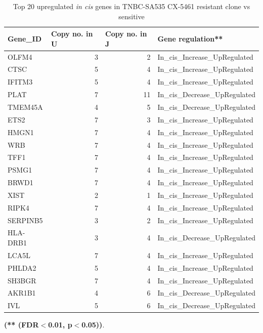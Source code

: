  \begin{table}[htbp]
   \centering
   \caption{Top 20 upregulated \textit{in cis} genes in TNBC-SA535  CX-5461 resistant clone vs sensitive}
     \begin{tabular}{|l|r|r|l|}
     \hline
     \textbf{Gene\_ID} & \multicolumn{1}{|l|}{\textbf{Copy no. in  U} }& \multicolumn{1}{|l|}{\textbf{Copy no. in  J}} & \textbf{Gene regulation**} \\
     \hline
     OLFM4 & 3 & 2 & In\_cis\_Increase\_UpRegulated \\
     CTSC & 5 & 4 & In\_cis\_Increase\_UpRegulated \\
     IFITM3 & 5 & 4 & In\_cis\_Increase\_UpRegulated \\
     PLAT & 7 & 11 & In\_cis\_Decrease\_UpRegulated \\
     TMEM45A & 4 & 5 & In\_cis\_Decrease\_UpRegulated \\
     ETS2 & 7 & 3 & In\_cis\_Increase\_UpRegulated \\
     HMGN1 & 7 & 4 & In\_cis\_Increase\_UpRegulated \\
     WRB & 7 & 4 & In\_cis\_Increase\_UpRegulated \\
     TFF1 & 7 & 4 & In\_cis\_Increase\_UpRegulated \\
     PSMG1 & 7 & 4 & In\_cis\_Increase\_UpRegulated \\
     BRWD1 & 7 & 4 & In\_cis\_Increase\_UpRegulated \\
     XIST & 2 & 1 & In\_cis\_Increase\_UpRegulated \\
     RIPK4 & 7 & 4 & In\_cis\_Increase\_UpRegulated \\
     SERPINB5 & 3 & 2 & In\_cis\_Increase\_UpRegulated \\
     HLA-DRB1 & 3 & 4 & In\_cis\_Decrease\_UpRegulated \\
     LCA5L & 7 & 4 & In\_cis\_Increase\_UpRegulated \\
     PHLDA2 & 5 & 4 & In\_cis\_Increase\_UpRegulated \\
     SH3BGR & 7 & 4 & In\_cis\_Increase\_UpRegulated \\
     AKR1B1 & 4 & 6 & In\_cis\_Decrease\_UpRegulated \\
     IVL & 5 & 6 & In\_cis\_Decrease\_UpRegulated \\
     \hline
     \end{tabular}%
   \label{tab:top20SA535upregulatedCX}%
 
  \small\textbf{(** (FDR$<$0.01, p$<$0.05))}.

 \end{table}%


